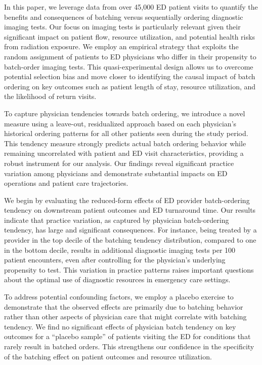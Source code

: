 \documentclass{article}
\begin{document}
In this paper, we leverage data from over 45,000 ED patient visits to
quantify the benefits and consequences of batching versus sequentially
ordering diagnostic imaging tests. Our focus on imaging tests is
particularly relevant given their significant impact on patient flow,
resource utilization, and potential health risks from radiation
exposure. We employ an empirical strategy that exploits the random
assignment of patients to ED physicians who differ in their propensity
to batch-order imaging tests. This quasi-experimental design allows us
to overcome potential selection bias and move closer to identifying the
causal impact of batch ordering on key outcomes such as patient length
of stay, resource utilization, and the likelihood of return visits.

To capture physician tendencies towards batch ordering, we introduce a
novel measure using a leave-out, residualized approach based on each
physician's historical ordering patterns for all other patients seen
during the study period. This tendency measure strongly predicts actual
batch ordering behavior while remaining uncorrelated with patient and ED
visit characteristics, providing a robust instrument for our analysis.
Our findings reveal significant practice variation among physicians and
demonstrate substantial impacts on ED operations and patient care
trajectories.

We begin by evaluating the reduced-form effects of ED provider
batch-ordering tendency on downstream patient outcomes and ED turnaround
time. Our results indicate that practice variation, as captured by
physician batch-ordering tendency, has large and significant
consequences. For instance, being treated by a provider in the top
decile of the batching tendency distribution, compared to one in the
bottom decile, results in additional diagnostic imaging tests per 100
patient encounters, even after controlling for the physician's
underlying propensity to test. This variation in practice patterns
raises important questions about the optimal use of diagnostic resources
in emergency care settings.

To address potential confounding factors, we employ a placebo exercise
to demonstrate that the observed effects are primarily due to batching
behavior rather than other aspects of physician care that might
correlate with batching tendency. We find no significant effects of
physician batch tendency on key outcomes for a ``placebo sample'' of
patients visiting the ED for conditions that rarely result in batched
orders. This strengthens our confidence in the specificity of the
batching effect on patient outcomes and resource utilization.
\end{document}
